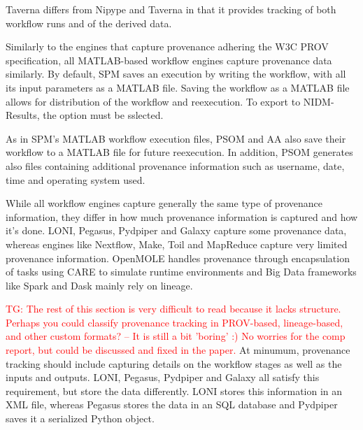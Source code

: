 \documentclass{report}
\newcommand{\tristan}[1]{\textcolor{red}{TG: #1}}
\begin{document}
            Taverna differs from Nipype and Taverna in that it provides 
            tracking of both workflow runs and of the derived data.

            Similarly to the engines that capture provenance adhering the
            W3C PROV specification, all MATLAB-based workflow engines capture
            provenance data similarly.
            By default, SPM saves an execution by writing the  workflow, with
            all its input parameters as a MATLAB file. Saving the workflow as
            a MATLAB file allows for distribution of the workflow and 
            reexecution. To export to NIDM-Results, the option must be 
            sslected.
            
            As in SPM's MATLAB workflow execution files, PSOM and AA 
            also save
            their workflow to a MATLAB file for future reexecution. 
            In addition, PSOM generates
            also files containing additional provenance information such 
            as username, date, time and operating system used.
            
            While all workflow engines capture generally the same type of 
            provenance information, they differ in how much provenance 
            information is captured and how it's done. LONI, Pegasus, Pydpiper 
            and Galaxy
            capture some provenance data, whereas engines 
            like Nextflow, Make, Toil and MapReduce capture very limited  
            provenance 
            information. OpenMOLE handles provenance through encapsulation of
            tasks using CARE to simulate runtime environments
            and Big Data frameworks like Spark and Dask mainly rely on 
            lineage.

            \tristan{The rest of this section is very difficult to read because
            it lacks structure. Perhaps you could classify provenance tracking in PROV-based, lineage-based,
            and other custom formats? -- It is still a bit 'boring' :) No worries for the comp report,
            but could be discussed and fixed in the paper.}
            At minumum, provenance tracking should include 
            capturing details on the workflow stages as well as the inputs and
            outputs. LONI, Pegasus, Pydpiper and Galaxy all satisfy this 
            requirement, but store the data differently. LONI stores this 
            information in an XML file, whereas Pegasus stores the data in an 
            SQL database and Pydpiper saves it a serialized Python object.
\end{document}
